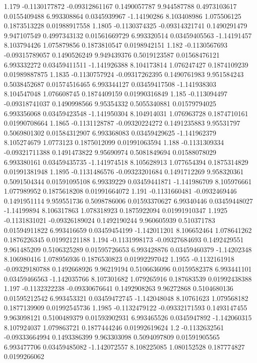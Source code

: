 {1.179 -0.1130177872 -0.09312861167 0.1490057787 9.944587788 0.4973103617 0.0155409488 6.993308864 0.0345939967 -1.14190286 8.103408986 1.075506125 0.1873513228 0.01988917558
1.1805 -0.1130374325 -0.09314321741 0.1490291479 9.947107549 0.4997343132 0.01561669729 6.993320514 0.03459405563 -1.14191457 8.103794426 1.075879856 0.1873810547 0.0198942151
1.182 -0.1130567693 -0.09315789057 0.1490526249 9.949439376 0.5019123587 0.01568476121 6.993332272 0.03459411511 -1.141926388 8.104173814 1.076247427 0.1874109239 0.01989887875
1.1835 -0.1130757924 -0.09317262395 0.1490761983 9.951584243 0.5038452687 0.01574516465 6.993344127 0.03459417508 -1.141938303 8.104547048 1.076608745 0.1874409159 0.01990316849
1.185 -0.113094497 -0.09318741037 0.1490998566 9.95354332 0.5055340881 0.01579794025 6.993356068 0.03459423548 -1.141950304 8.104914031 1.076963728 0.1874710161 0.01990708664
1.1865 -0.1131128787 -0.09320224272 0.1491235883 9.95531797 0.5069801302 0.01584312907 6.993368083 0.03459429625 -1.141962379 8.105274679 1.0773123 0.1875012099 0.01991063594
1.188 -0.1131309334 -0.09321711388 0.1491473822 9.95690974 0.5081849694 0.01588078029 6.993380161 0.03459435735 -1.141974518 8.105628913 1.077654394 0.1875314829 0.01991381948
1.1895 -0.1131486576 -0.09323201684 0.1491712269 9.958320361 0.5091504344 0.01591095108 6.99339229 0.03459441871 -1.141986709 8.105976661 1.077989952 0.1875618208 0.01991664072
1.191 -0.1131660481 -0.0932469446 0.1491951114 9.959551736 0.5098786006 0.01593370627 6.99340446 0.03459448027 -1.14199894 8.106317863 1.078318923 0.1875922094 0.01991910347
1.1925 -0.1131831021 -0.09326189024 0.1492190244 9.960605939 0.510371783 0.01594911822 6.993416659 0.03459454199 -1.142011201 8.106652464 1.078641262 0.1876226345 0.01992121188
1.194 -0.1131998173 -0.09327684693 0.1492429551 9.961485209 0.5106325289 0.01595726653 6.993428876 0.03459460379 -1.14202348 8.106980416 1.078956936 0.1876530823 0.01992297042
1.1955 -0.1132161918 -0.09329180788 0.1492668926 9.96219194 0.5106636096 0.0159582378 6.993441101 0.03459466563 -1.142035766 8.107301682 1.079265916 0.187683539 0.01992438388
1.197 -0.1132322238 -0.09330676641 0.1492908263 9.96272868 0.5104680136 0.01595212542 6.993453321 0.03459472745 -1.142048048 8.10761623 1.079568182 0.1877139909 0.01992545736
1.1985 -0.1132479122 -0.09332171593 0.1493147455 9.963098121 0.5100489379 0.01593902931 6.993465526 0.0345947892 -1.142060315 8.107924037 1.079863721 0.1877444246 0.01992619624
1.2 -0.1132632561 -0.09333664994 0.1493386399 9.963303098 0.5094097809 0.01591905565 6.993477706 0.03459485082 -1.142072557 8.108225085 1.080152528 0.187774827 0.0199266062
}

